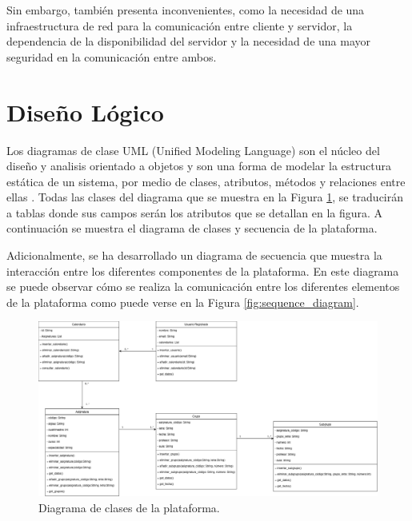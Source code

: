 Sin embargo, también presenta inconvenientes, como la necesidad de una infraestructura de red para la comunicación entre cliente y servidor, la dependencia de la disponibilidad del servidor y la necesidad de una mayor seguridad en la comunicación entre ambos.\newline

\section{Diseño Lógico}

Los diagramas de clase UML (Unified Modeling Language) son el núcleo del diseño y analisis orientado a objetos y son una forma de modelar la estructura estática de un sistema, por medio de clases, atributos, métodos y relaciones entre ellas \cite{herchi2012user}. Todas las clases del diagrama que se muestra en la Figura \ref{fig:class_diagram}, se traducirán a tablas donde sus campos serán los atributos que se detallan en la figura. A continuación se muestra el diagrama de clases y secuencia de la plataforma.\newline

Adicionalmente, se ha desarrollado un diagrama de secuencia que muestra la interacción entre los diferentes componentes de la plataforma. En este diagrama se puede observar cómo se realiza la comunicación entre los diferentes elementos de la plataforma como puede verse en la Figura \ref{fig:sequence_diagram}.\newline

\newpage

\begin{landscape}
    \begin{figure}[H]
        \centering
        \includegraphics[width=1.6\textwidth]{./imagenes/Class_Diagram.png}
        \caption{Diagrama de clases de la plataforma.}
        \label{fig:class_diagram}
    \end{figure}  
\end{landscape}

